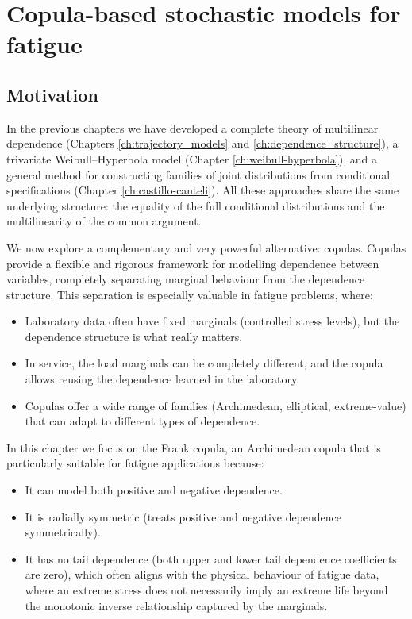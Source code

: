 \startcontents[chapter]
\chapter{Copula-based stochastic models for fatigue}
\label{ch:copula-models}
\minitocboxed

\section*{Motivation}

In the previous chapters we have developed a complete theory of multilinear dependence (Chapters \ref{ch:trajectory_models} and \ref{ch:dependence_structure}), a trivariate Weibull–Hyperbola model (Chapter \ref{ch:weibull-hyperbola}), and a general method for constructing families of joint distributions from conditional specifications (Chapter \ref{ch:castillo-canteli}). All these approaches share the same underlying structure: the equality of the full conditional distributions and the multilinearity of the common argument.

We now explore a complementary and very powerful alternative: copulas. Copulas provide a flexible and rigorous framework for modelling dependence between variables, completely separating marginal behaviour from the dependence structure. This separation is especially valuable in fatigue problems, where:

\begin{itemize}
    \item Laboratory data often have fixed marginals (controlled stress levels), but the dependence structure is what really matters.
    \item In service, the load marginals can be completely different, and the copula allows reusing the dependence learned in the laboratory.
    \item Copulas offer a wide range of families (Archimedean, elliptical, extreme-value) that can adapt to different types of dependence.
\end{itemize}

In this chapter we focus on the Frank copula, an Archimedean copula that is particularly suitable for fatigue applications because:

\begin{itemize}
    \item It can model both positive and negative dependence.
    \item It is radially symmetric (treats positive and negative dependence symmetrically).
    \item It has no tail dependence (both upper and lower tail dependence coefficients are zero), which often aligns with the physical behaviour of fatigue data, where an extreme stress does not necessarily imply an extreme life beyond the monotonic inverse relationship captured by the marginals.
\end{itemize}

